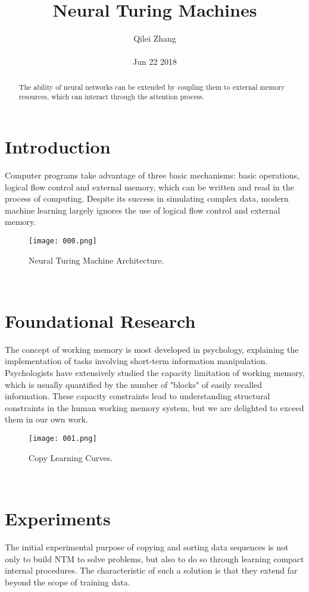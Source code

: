 \documentclass[30pt,twocolumn,letterpaper]{article}
\author{Qilei Zhang\\\\
Jun 22 2018}
\title{Neural Turing Machines}
\begin{document}
\maketitle
\begin{abstract}
  The ability of neural networks can be extended by coupling them to external memory resources, which can interact through the attention process.
\end{abstract}
\section{Introduction}
Computer programs take advantage of three basic mechanisms: basic operations, logical flow control and external memory, which can be written and read in the process of computing. Despite its success in simulating complex data, modern machine learning largely ignores the use of logical flow control and external memory\cite{Arbib1961Turing}. \\
\begin{figure}[htbp]
\small
\centering
\texttt{[image: 000.png]}
\caption{Neural Turing Machine Architecture.}
\label{fig:lable}
\end{figure}\\
\section{Foundational Research}
The concept of working memory is most developed in psychology, explaining the implementation of tasks involving short-term information manipulation. Psychologists have extensively studied the capacity limitation of working memory\cite{Moore1997Quantum}, which is usually quantified by the number of "blocks" of easily recalled information. These capacity constraints lead to understanding structural constraints in the human working memory system, but we are delighted to exceed them in our own work\cite{Wells1998Turing}.\\
\begin{figure}[htbp]
\small
\centering
\texttt{[image: 001.png]}
\caption{Copy Learning Curves.}
\label{fig:lable}
\end{figure}\\
\section{Experiments}
The initial experimental purpose of copying and sorting data sequences is not only to build NTM to solve problems, but also to do so through learning compact internal procedures. The characteristic of such a solution is that they extend far beyond the scope of training data\cite{Yu2015Empirical}.
{\small


}
\end{document}

